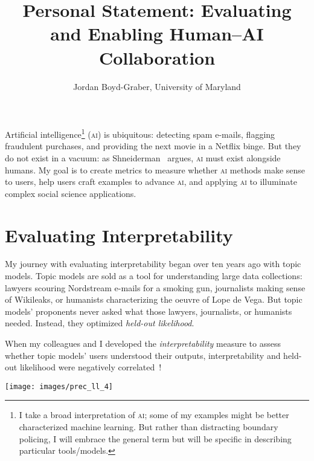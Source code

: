 \documentclass[11pt]{amsart}
\newcommand{\abr}[1]{\textsc{#1}}
\begin{document}
 \title{Personal Statement: Evaluating and Enabling Human--AI Collaboration}

 \author{Jordan Boyd-Graber, University of Maryland}



\maketitle

Artificial intelligence\footnote{I take a broad interpretation of
\abr{ai}; some of my examples might be better characterized machine
learning.  But rather than distracting boundary policing, I will embrace
the general term but will be specific in describing particular tools/models.}
(\abr{ai}) is ubiquitous: detecting spam e-mails, flagging fraudulent
purchases, and providing the next movie in a Netflix binge.
%
But they do not exist in a vacuum: as
Shneiderman~\cite{shneiderman-21} argues, \abr{ai} must exist
alongside humans.
%
My goal is to create metrics to measure whether \abr{ai} methods make
sense to users, help users craft examples to advance \abr{ai}, and
applying \abr{ai} to illuminate complex social
science applications.

\section{Evaluating Interpretability}

My journey with evaluating interpretability began over ten years ago
with topic models.
%
Topic models are sold as a tool for understanding large data
collections: lawyers scouring Nordstream e-mails for a smoking gun,
journalists making sense of Wikileaks, or humanists characterizing the
oeuvre of Lope de Vega.
%
But topic models' proponents never asked what those lawyers,
journalists, or humanists needed.
%
Instead, they optimized \emph{held-out likelihood}.

When my colleagues
and I developed the \emph{interpretability} measure to assess whether topic
models' users understood their outputs, interpretability and
held-out likelihood were negatively correlated~\cite{chang-09b}!
%

\begin{center}
\texttt{[image: images/prec\_ll\_4]}
\end{center}
\end{document}
